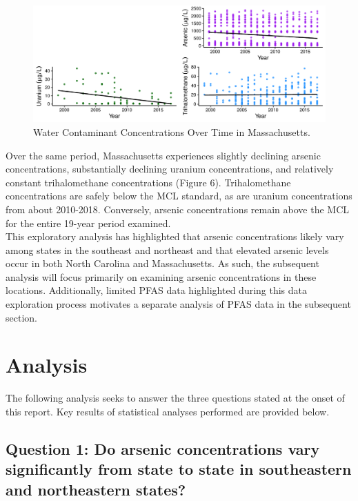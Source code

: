\documentclass[12pt,]{article}
\begin{document}
\newpage

\begin{figure}
\centering
\includegraphics{Project_Template_files/figure-latex/figs6-1.pdf}
\caption{Water Contaminant Concentrations Over Time in Massachusetts.}
\end{figure}

Over the same period, Massachusetts experiences slightly declining
arsenic concentrations, substantially declining uranium concentrations,
and relatively constant trihalomethane concentrations (Figure 6).
Trihalomethane concentrations are safely below the MCL standard, as are
uranium concentrations from about 2010-2018. Conversely, arsenic
concentrations remain above the MCL for the entire 19-year period
examined.\\
This exploratory analysis has highlighted that arsenic concentrations
likely vary among states in the southeast and northeast and that
elevated arsenic levels occur in both North Carolina and Massachusetts.
As such, the subsequent analysis will focus primarily on examining
arsenic concentrations in these locations. Additionally, limited PFAS
data highlighted during this data exploration process motivates a
separate analysis of PFAS data in the subsequent section.

\newpage

\hypertarget{analysis}{%
\section{Analysis}\label{analysis}}

The following analysis seeks to answer the three questions stated at the
onset of this report. Key results of statistical analyses performed are
provided below.

\hypertarget{question-1-do-arsenic-concentrations-vary-significantly-from-state-to-state-in-southeastern-and-northeastern-states}{%
\subsection{Question 1: Do arsenic concentrations vary significantly
from state to state in southeastern and northeastern
states?}\label{question-1-do-arsenic-concentrations-vary-significantly-from-state-to-state-in-southeastern-and-northeastern-states}}
\end{document}
